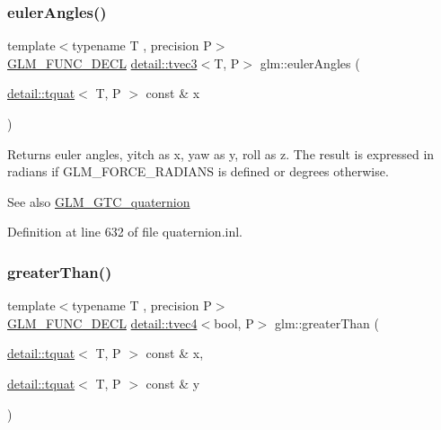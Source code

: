 \subsubsection{\texorpdfstring{euler\+Angles()}{eulerAngles()}}
{\footnotesize\ttfamily template$<$typename T , precision P$>$ \\
\hyperlink{setup_8hpp_ab2d052de21a70539923e9bcbf6e83a51}{G\+L\+M\+\_\+\+F\+U\+N\+C\+\_\+\+D\+E\+CL} \hyperlink{structglm_1_1detail_1_1tvec3}{detail\+::tvec3}$<$T, P$>$ glm\+::euler\+Angles (\begin{DoxyParamCaption}\item[{\hyperlink{structglm_1_1detail_1_1tquat}{detail\+::tquat}$<$ T, P $>$ const \&}]{x }\end{DoxyParamCaption})}

Returns euler angles, yitch as x, yaw as y, roll as z. The result is expressed in radians if G\+L\+M\+\_\+\+F\+O\+R\+C\+E\+\_\+\+R\+A\+D\+I\+A\+NS is defined or degrees otherwise.

\begin{DoxySeeAlso}{See also}
\hyperlink{group__gtc__quaternion}{G\+L\+M\+\_\+\+G\+T\+C\+\_\+quaternion} 
\end{DoxySeeAlso}


Definition at line 632 of file quaternion.\+inl.

\mbox{\label{group__gtc__quaternion_ga63be67bccef0b0ad4e60656223ab3761}} 
\subsubsection{\texorpdfstring{greater\+Than()}{greaterThan()}}
{\footnotesize\ttfamily template$<$typename T , precision P$>$ \\
\hyperlink{setup_8hpp_ab2d052de21a70539923e9bcbf6e83a51}{G\+L\+M\+\_\+\+F\+U\+N\+C\+\_\+\+D\+E\+CL} \hyperlink{structglm_1_1detail_1_1tvec4}{detail\+::tvec4}$<$bool, P$>$ glm\+::greater\+Than (\begin{DoxyParamCaption}\item[{\hyperlink{structglm_1_1detail_1_1tquat}{detail\+::tquat}$<$ T, P $>$ const \&}]{x,  }\item[{\hyperlink{structglm_1_1detail_1_1tquat}{detail\+::tquat}$<$ T, P $>$ const \&}]{y }\end{DoxyParamCaption})}


